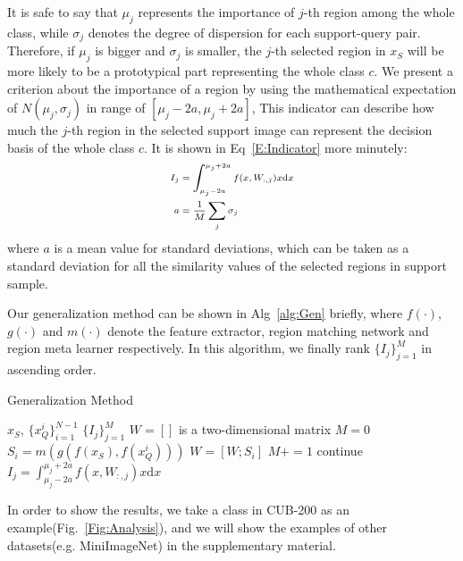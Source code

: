 \documentclass[letterpaper]{article}
\begin{document}
It is safe to say that $\mu_{j}$ represents the importance of $j$-th region among the whole class, while $\sigma_{j}$ denotes the degree of dispersion for each support-query pair. Therefore, if $\mu_{j}$ is bigger and $\sigma_{j}$ is smaller, the $j$-th selected region in $x_{S}$ will be more likely to be a prototypical part representing the whole class $c$. We present a criterion about the importance of a region by using the mathematical expectation of $N(\mu_{j},\sigma_{j})$ in range of $[\mu_{j}-2a,\mu_{j}+2a]$, This indicator can describe how much the $j$-th region in the selected support image can represent the decision basis of the whole class $c$. It is shown in Eq~\ref{E:Indicator} more minutely:
\begin{equation}\scriptsize
\begin{aligned}
     I_{j} &= \int_{\mu_{j}-2a}^{\mu_{j}+2a} f(x,W_{:,j})x \mathrm{d}x\label{E:Indicator}\\
    a &= \frac{1}{M}\sum_{j}\sigma_{j}
\end{aligned}
\end{equation}
where $a$ is a mean value for standard deviations, which can be taken as a standard deviation for all the similarity values of the selected regions in support sample. 

Our generalization method can be shown in Alg~\ref{alg:Gen} briefly, where $f(\cdot)$, $g(\cdot)$ and $m(\cdot)$ denote the feature extractor, region matching network and region meta learner respectively. In this algorithm, we finally rank $\{I_{j}\}_{j=1}^{M}$ in ascending order.

\begin{algorithm}
\caption{Generalization Method}
\label{alg:Gen}
\begin{algorithmic}[1]
\REQUIRE $x_{S}$, $\{x^{i}_{Q}\}^{N-1}_{i=1}$
\ENSURE $\{I_{j}\}_{j=1}^{M}$
\STATE $W = []$ is a two-dimensional matrix
\STATE $M = 0$
\STATE $S_{i} = m(g(f(x_{S}),f(x_{Q}^{i})))$
\STATE $W = [W;S_{i}]$
\STATE $M+=1$
\ELSE 
\STATE continue
\ENDIF
\ENDFOR 
{}
\STATE $I_{j}=\int_{\mu_{j}-2a}^{\mu_{j}+2a} f(x,W_{:,j})x \mathrm{d}x$
\ENDFOR
\end{algorithmic}
\end{algorithm}

In order to show the results, we take a class in CUB-200 as an example(Fig.~\ref{Fig:Analysis}), and we will show the examples of other datasets(e.g. MiniImageNet) in the supplementary material. 
\end{document}
